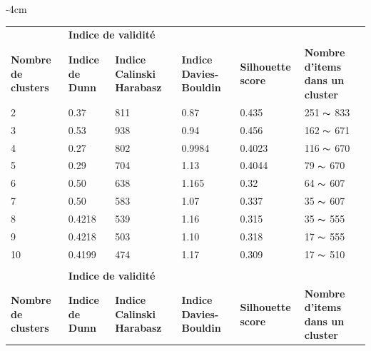 \begin{table}[H]
	\centering
	\addtolength{\leftskip} {-4cm}
	\addtolength{\rightskip}{-4.5cm}
	\begin{tabular}{|m{2cm}|m{2cm}|m{2cm}|m{2cm}|m{2cm}|m{3cm}|}
	\hline
	\rowcolor{blueforest}
	\multicolumn{6}{|m{16cm}|}{\centering \color{white} \textbf{Kmeans clustering} } \\ \hline
	&  \multicolumn{4}{|m{8cm}|}{\centering \textbf{Indice de validité} } & \\ \hline
	\textbf{Nombre de clusters}  &   \textbf{Indice de Dunn} & \textbf{Indice Calinski Harabasz}& \textbf{Indice Davies-Bouldin} & \textbf{Silhouette score}  &  \textbf{Nombre d'items dans un cluster }\\ \hline
	2  & 0.37  & 811  & \cellcolor{gray!40} 0.87   &  0.435   & 251  \(\displaystyle \thicksim  \) 833  \\ \hline %
	3  & \cellcolor{gray!40} 0.53  &\cellcolor{gray!40}  938  & 0.94   &  \cellcolor{gray!40} 0.456   & 162  \(\displaystyle \thicksim  \) 671  \\ \hline
	4  & 0.27  & 802  & 0.9984   &  0.4023   & 116  \(\displaystyle \thicksim  \) 670  \\ \hline
	5  & 0.29  & 704   & 1.13   &  0.4044  & 79   \(\displaystyle \thicksim  \) 670  \\ \hline
	6  & 0.50  & 638   & 1.165   &  0.32  & 64   \(\displaystyle \thicksim  \) 607  \\ \hline
	7  & 0.50  & 583   & 1.07   &  0.337  & 35   \(\displaystyle \thicksim  \) 607  \\ \hline
	8  & 0.4218  & 539   & 1.16   &  0.315  & 35   \(\displaystyle \thicksim  \) 555  \\ \hline
	9  & 0.4218  & 503   & 1.10   &  0.318   & 17   \(\displaystyle \thicksim  \) 555  \\ \hline
	10 & 0.4199  & 474   & 1.17   &  0.309   & 17   \(\displaystyle \thicksim  \) 510  \\ \hline \hline
	\rowcolor{blueforest}
	\multicolumn{6}{|m{16cm}|}{\centering \color{white} \textbf{Agglomérative clustering} } \\ \hline
	&  \multicolumn{4}{|m{8cm}|}{\centering \textbf{Indice de validité} } & \\ \hline
	\textbf{Nombre de clusters}  &   \textbf{Indice de Dunn} & \textbf{Indice Calinski Harabasz}& \textbf{Indice Davies-Bouldin} & \textbf{Silhouette score}  &  \textbf{Nombre d'items dans un cluster }\\ \hline

\end{tabular}
\end{table}
